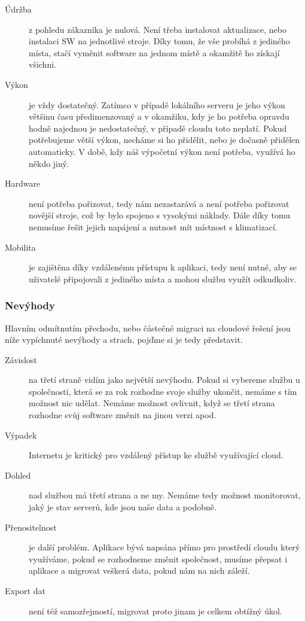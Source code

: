 \begin{description}
  \item [Údržba] z pohledu zákazníka je nulová. Není třeba instalovat aktualizace, nebo instalaci SW na jednotlivé stroje. Díky tomu, že vše probíhá z jediného místa, stačí vyměnit software na jednom místě a okamžitě ho získají všichni.
	\item [Výkon] je vždy dostatečný. Zatímco v případě lokálního serveru je jeho výkon většinu času předimenzovaný a v okamžiku, kdy je ho potřeba opravdu hodně najednou je nedostatečný, v případě cloudu toto neplatí. Pokud potřebujeme větší výkon, necháme si ho přidělit, nebo je dočasně přidělen automaticky. V době, kdy náš výpočetní výkon není potřeba, využívá ho někdo jiný.
  \item [Hardware] není potřeba pořizovat, tedy nám nezastarává a není potřeba pořizovat novější stroje, což by bylo spojeno s vysokými náklady. Dále díky tomu nemusíme řešit jejich napájení a nutnost mít místnost s klimatizací.
  \item [Mobilita] je zajištěna díky vzdálenému přístupu k aplikaci, tedy není nutné, aby se uživatelé připojovali z jediného místa a mohou službu využít odkudkoliv.
\end{description}

\subsubsection{Nevýhody}
Hlavním odmítnutím přechodu, nebo částečné migraci na cloudové řešení jsou níže vypíchnuté nevýhody a strach, pojďme si je tedy představit.

\begin{description}
  \item [Závislost] na třetí straně vidím jako největší nevýhodu. Pokud si vybereme službu u společnosti, která se za rok rozhodne svoje služby ukončit, nemáme s tím možnost nic udělat. Nemáme možnost ovlivnit, když se třetí strana rozhodne svůj software změnit na jinou verzi apod.
  \item [Výpadek] Internetu je kritický pro vzdálený přístup ke službě využívající cloud.
  \item [Dohled] nad službou má třetí strana a ne my. Nemáme tedy možnost monitorovat, jaký je stav serverů, kde jsou naše data a podobně.
  \item [Přenositelnost] je další problém. Aplikace bývá napsána přímo pro prostředí cloudu který využíváme, pokud se rozhodneme změnit společnost, musíme přepsat i aplikace a migrovat veškerá data, pokud nám na nich záleží.
  \item [Export dat] není též samozřejmostí, migrovat proto jinam je celkem obtížný úkol.
\end{description}

